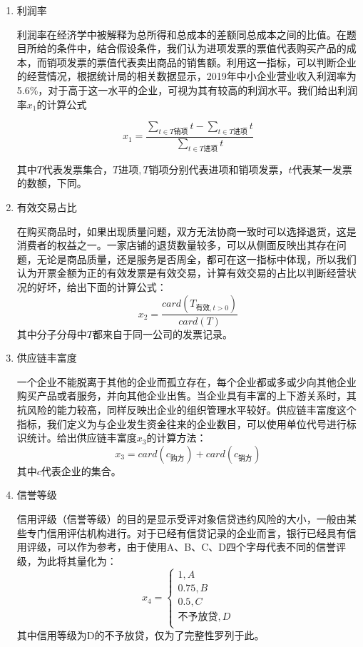 \documentclass{my_paper}
\begin{document}
\begin{enumerate}
    \item 利润率
    
    利润率\cite{1}在经济学中被解释为总所得和总成本的差额同总成本之间的比值。在题目所给的条件中，结合假设条件，我们认为进项发票的票值代表购买产品的成本，而销项发票的票值代表卖出商品的销售额。利用这一指标，可以判断企业的经营情况，根据统计局的相关数据\cite{2}显示，2019年中小企业营业收入利润率为5.6\%，对于高于这一水平的企业，可视为其有较高的利润水平。我们给出利润率$x_1$的计算公式

    \begin{equation}
    x_1 = \frac{\sum\limits_{t\in T\text{销项}}t-\sum\limits_{t\in T\text{进项}}t}{\sum\limits_{t\in T\text{进项}}t}
    \label{x1}
    \end{equation}

    其中$T$代表发票集合，$T\text{进项},T\text{销项}$分别代表进项和销项发票，$t$代表某一发票的数额，下同。
    \item 有效交易占比
    
    在购买商品时，如果出现质量问题，双方无法协商一致时可以选择退货，这是消费者的权益之一。一家店铺的退货数量较多，可以从侧面反映出其存在问题，无论是商品质量，还是服务是否周全，都可在这一指标中体现，所以我们认为开票金额为正的有效发票是有效交易，计算有效交易的占比以判断经营状况的好坏，给出下面的计算公式：
    \begin{equation}
        x_2 = \frac{card(T_{\text{有效},t>0})}{card(T)}
        \label{x2}
    \end{equation}
    其中分子分母中$T$都来自于同一公司的发票记录。

    \item 供应链丰富度
    
    一个企业不能脱离于其他的企业而孤立存在，每个企业都或多或少向其他企业购买产品或者服务，并向其他企业出售。当企业具有丰富的上下游关系时，其抗风险的能力较高，同样反映出企业的组织管理水平较好。供应链丰富度这个指标，我们定义为与企业发生资金往来的企业数目，可以使用单位代号进行标识统计。给出供应链丰富度$x_3$的计算方法：
    \begin{equation}
    x_3 = card(c_{\text{购方}})+card(c_{\text{销方}})
    \label{x3}
    \end{equation}
    其中$c$代表企业的集合。
    \item 信誉等级
    
    信用评级\cite{3}（信誉等级）的目的是显示受评对象信贷违约风险的大小，一般由某些专门信用评估机构进行。对于已经有信贷记录的企业而言，银行已经具有信用评级，可以作为参考，由于使用A、B、C、D四个字母代表不同的信誉评级，为此将其量化为：
    \begin{equation}
    x_4 = \begin{cases}
        1,A\\
        0.75,B\\
        0.5,C\\
        \text{不予放贷},D\\
    \end{cases}
    \label{x4}
    \end{equation}
    其中信用等级为D的不予放贷，仅为了完整性罗列于此。


\end{enumerate}
\end{document}
